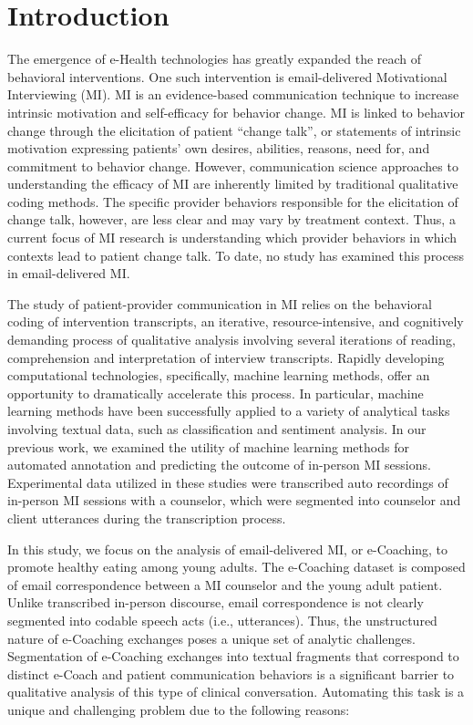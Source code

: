 \documentclass{amia}
\begin{document}
\section*{Introduction}
The emergence of e-Health technologies has greatly expanded the reach of behavioral interventions. One such intervention is email-delivered Motivational Interviewing (MI). MI is an evidence-based communication technique to increase intrinsic motivation and self-efficacy for behavior change\cite{miller2012motivational,miller2009toward}. MI is linked to behavior change through the elicitation of patient ``change talk'', or statements of intrinsic motivation expressing patients’ own desires, abilities, reasons, need for, and commitment to behavior change\cite{apodaca2009mechanisms}. However, communication science approaches to understanding the efficacy of MI are inherently limited by traditional qualitative coding methods. The specific provider behaviors responsible for the elicitation of change talk, however, are less clear and may vary by treatment context. Thus, a current focus of MI research is understanding which provider behaviors in which contexts lead to patient change talk. To date, no study has examined this process in email-delivered MI.

The study of patient-provider communication in MI relies on the behavioral coding of intervention transcripts, an iterative, resource-intensive, and cognitively demanding process of qualitative analysis involving several iterations of reading, comprehension and interpretation of interview transcripts. Rapidly developing computational technologies, specifically, machine learning methods, offer an opportunity to dramatically accelerate this process. In particular, machine learning methods have been successfully applied to a variety of analytical tasks involving textual data, such as classification\cite{nigam2000text} and sentiment analysis.\cite{wang2012baselines} In our previous work, we examined the utility of machine learning methods for automated annotation \cite{hasan2016study,kotov2015interpretable} and predicting the outcome \cite{hasan2018predicting} of in-person MI sessions. Experimental data utilized in these studies were transcribed auto recordings of in-person MI sessions with a counselor, which were segmented into counselor and client utterances during the transcription process. 

In this study, we focus on the analysis of email-delivered MI, or e-Coaching, to promote healthy eating among young adults. The e-Coaching dataset is composed of email correspondence between a MI counselor and the young adult patient. Unlike transcribed in-person discourse, email correspondence is not clearly segmented into codable speech acts (i.e., utterances). Thus, the unstructured nature of e-Coaching exchanges poses a unique set of analytic challenges. Segmentation of e-Coaching exchanges into textual fragments that correspond to distinct e-Coach and patient communication behaviors is a significant barrier to qualitative analysis of this type of clinical conversation. Automating this task is a unique and challenging problem due to the following reasons:
\end{document}
